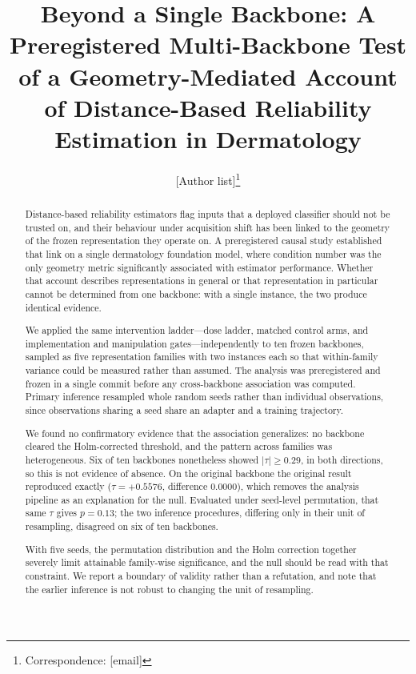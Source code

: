\documentclass[11pt,a4paper]{article}
\title{\bfseries Beyond a Single Backbone: A Preregistered Multi-Backbone Test
of a Geometry-Mediated Account of Distance-Based Reliability Estimation in
Dermatology}
\author{%
  [Author list]\thanks{Correspondence: [email]}%
}
\date{}
\begin{document}
\maketitle

\begin{abstract}
\noindent
Distance-based reliability estimators flag inputs that a deployed classifier
should not be trusted on, and their behaviour under acquisition shift has been
linked to the geometry of the frozen representation they operate on. A
preregistered causal study established that link on a single dermatology
foundation model, where condition number was the only geometry metric
significantly associated with estimator performance. Whether that account
describes representations in general or that representation in particular cannot
be determined from one backbone: with a single instance, the two produce
identical evidence.

We applied the same intervention ladder---dose ladder, matched control arms, and
implementation and manipulation gates---independently to ten frozen backbones,
sampled as five representation families with two instances each so that
within-family variance could be measured rather than assumed. The analysis was
preregistered and frozen in a single commit before any cross-backbone
association was computed. Primary inference resampled whole random seeds rather
than individual observations, since observations sharing a seed share an adapter
and a training trajectory.

We found no confirmatory evidence that the association generalizes: no backbone
cleared the Holm-corrected threshold, and the pattern across families was
heterogeneous. Six of ten backbones nonetheless showed $|\tau| \ge 0.29$, in both
directions, so this is not evidence of absence. On the original backbone the
original result reproduced exactly ($\tau = +0.5576$, difference $0.0000$), which
removes the analysis pipeline as an explanation for the null. Evaluated under
seed-level permutation, that same $\tau$ gives $p = 0.13$; the two inference
procedures, differing only in their unit of resampling, disagreed on six of ten
backbones.

With five seeds, the permutation distribution and the Holm correction together
severely limit attainable family-wise significance, and the null should be read
with that constraint. We report a boundary of validity rather than a refutation,
and note that the earlier inference is not robust to changing the unit of
resampling.
\end{abstract}
\end{document}
